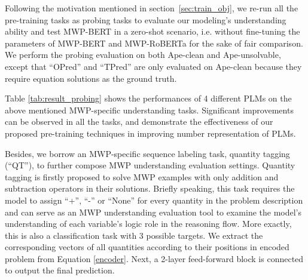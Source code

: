 \documentclass[11pt]{article}
\begin{document}
Following the motivation mentioned in section~\ref{sec:train_obj}, we re-run all the pre-training tasks as probing tasks to evaluate our modeling's understanding ability and test MWP-BERT in a zero-shot scenario, i.e. without fine-tuning the parameters of MWP-BERT and MWP-RoBERTa for the sake of fair comparison. We perform the probing evaluation on both Ape-clean and Ape-unsolvable, except that ``OPred'' and ``TPred'' are only evaluated on Ape-clean because they require equation solutions as the ground truth.
\begin{table}[H]
\renewcommand\arraystretch{1.0}
\centering
{}
\caption{Comparison of tagging accuracy (\%) between our proposed models and   baselines.}
\label{tab:result_tagging}
\end{table} 

Table \ref{tab:result_probing} shows the performances of 4 different PLMs on the above mentioned MWP-specific understanding tasks.
Significant improvements can be observed in all the tasks, and demonstrate the effectiveness of our proposed pre-training techniques in improving number representation of PLMs. 

Besides, we borrow an MWP-specific sequence labeling task, quantity tagging~\cite{zou2019text2math} (``QT''), to further compose MWP understanding evaluation settings. Quantity tagging \cite{DBLP:conf/acl/ZouL19} is firstly proposed to solve MWP examples with only addition and subtraction operators in their solutions. Briefly speaking, this task requires the model to assign ``+'', ``-'' or ``None'' for every quantity in the problem description and can serve as an MWP understanding evaluation tool to examine the model's understanding of each variable's logic role in the reasoning flow.  More exactly, this is also a classification task with 3 possible targets. We extract the corresponding vectors of all quantities according to their positions in encoded problem  from Equation \ref{encoder}. Next, a 2-layer feed-forward block is connected to output the final prediction. 
\end{document}
